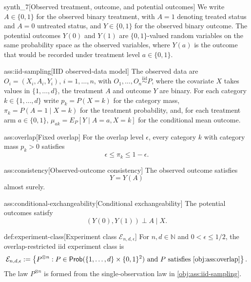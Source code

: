 \begin{definitionv}{synth_7}[Observed treatment, outcome, and potential outcomes]
We write \(A\in\{0,1\}\) for the observed binary treatment, with \(A=1\) denoting treated status and \(A=0\) untreated status, and \(Y\in\{0,1\}\) for the observed binary outcome. The potential outcomes \(Y(0)\) and \(Y(1)\) are \(\{0,1\}\)-valued random variables on the same probability space as the observed variables, where \(Y(a)\) is the outcome that would be recorded under treatment level \(a\in\{0,1\}\).
\end{definitionv}

\begin{assumptionv}{ass:iid-sampling}[IID observed-data model]
The observed data are \(O_i=(X_i,A_i,Y_i)\), \(i=1,\ldots,n\), with \(O_1,\ldots,O_n\stackrel{\mathrm{iid}}{\sim}P\), where the covariate \(X\) takes values in \(\{1,\ldots,d\}\), the treatment \(A\) and outcome \(Y\) are binary. For each category \(k\in\{1,\ldots,d\}\) write \(p_k=P(X=k)\) for the category mass, \(\pi_k=P(A=1\mid X=k)\) for the treatment probability, and, for each treatment arm \(a\in\{0,1\}\), \(\mu_{ak}=E_P[Y\mid A=a,X=k]\) for the conditional mean outcome.
\end{assumptionv}

\begin{assumptionv}{ass:overlap}[Fixed overlap]
For the overlap level \(\epsilon\), every category \(k\) with category mass \(p_k>0\) satisfies
\[
\epsilon \le \pi_k \le 1-\epsilon .
\]
\end{assumptionv}

\begin{assumptionv}{ass:consistency}[Observed-outcome consistency]
The observed outcome satisfies
\[
Y=Y(A)
\]
almost surely.
\end{assumptionv}

\begin{assumptionv}{ass:conditional-exchangeability}[Conditional exchangeability]
The potential outcomes satisfy
\[
(Y(0),Y(1))\perp A\mid X .
\]
\end{assumptionv}

\begin{definitionv}{def:experiment-class}[Experiment class \(\mathcal E_{n,d,\epsilon}\)]
For \(n,d\in\mathbb N\) and \(0<\epsilon\le 1/2\), the overlap-restricted iid experiment class is
\[
\mathcal E_{n,d,\epsilon}
:=
\left\{
P^{\otimes n}:
P\in\mathsf{Prob}(\{1,\ldots,d\}\times\{0,1\}^2)
\ \text{and } P \text{ satisfies } \cref{obj:ass:overlap}
\right\}.
\]
The law \(P^{\otimes n}\) is formed from the single-observation law in \cref{obj:ass:iid-sampling}.
\end{definitionv}

